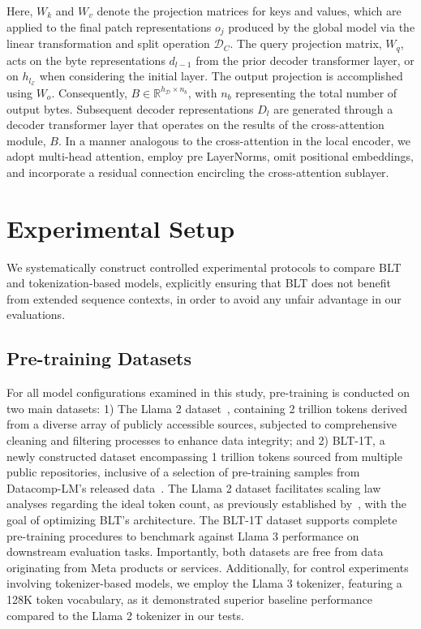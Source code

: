 Here, $W_k$ and $W_v$ denote the projection matrices for keys and values, which are applied to the final patch representations $o_j$ produced by the global model via the linear transformation and split operation $\mathcal{D}_C$. The query projection matrix, $W_q$, acts on the byte representations $d_{l-1}$ from the prior decoder transformer layer, or on $h_{l_{\mathcal{E}}}$ when considering the initial layer. The output projection is accomplished using $W_o$. Consequently, $B \in \mathbb{R}^{h_{\mathcal{D}} \times n_b}$, with $n_b$ representing the total number of output bytes. Subsequent decoder representations $D_l$ are generated through a decoder transformer layer that operates on the results of the cross-attention module, $B$. In a manner analogous to the cross-attention in the local encoder, we adopt multi-head attention, employ pre LayerNorms, omit positional embeddings, and incorporate a residual connection encircling the cross-attention sublayer.

\section{Experimental Setup}
\label{section:experiments}
We systematically construct controlled experimental protocols to compare {\textsc BLT} and tokenization-based models, explicitly ensuring that {\textsc BLT} does not benefit from extended sequence contexts, in order to avoid any unfair advantage in our evaluations.

\subsection{Pre-training Datasets} For all model configurations examined in this study, pre-training is conducted on two main datasets: 1) The Llama 2 dataset~\citep{touvron2023llama}, containing 2 trillion tokens derived from a diverse array of publicly accessible sources, subjected to comprehensive cleaning and filtering processes to enhance data integrity; and 2) {\textsc BLT}-1T, a newly constructed dataset encompassing 1 trillion tokens sourced from multiple public repositories, inclusive of a selection of pre-training samples from Datacomp-LM's released data~\citep{li2024datacomp}. The Llama 2 dataset facilitates scaling law analyses regarding the ideal token count, as previously established by~\cite{dubey2024llama}, with the goal of optimizing {\textsc BLT}'s architecture. The {\textsc BLT}-1T dataset supports complete pre-training procedures to benchmark against Llama 3 performance on downstream evaluation tasks. Importantly, both datasets are free from data originating from Meta products or services. Additionally, for control experiments involving tokenizer-based models, we employ the Llama 3 tokenizer, featuring a 128K token vocabulary, as it demonstrated superior baseline performance compared to the Llama 2 tokenizer in our tests.

